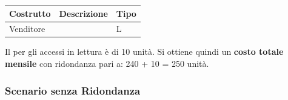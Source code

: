 \begin{itemize}
{\begin{longtable}{|
                >{\centering\arraybackslash}m{2cm}|
                >{\centering\arraybackslash}m{1.5cm}|
                >{\centering\arraybackslash}m{1cm}|
                }
                \hline
                \textbf{Costrutto} & \textbf{Descrizione} & \textbf{Tipo} \\
                \hline
                \endhead
                
                Venditore & 10 & L \\
                \hline
                
        \end{longtable}

        Il per gli accessi in lettura è di 10 unità.
        \newline Si ottiene quindi un \textbf{costo totale mensile} con ridondanza pari a: 240 + 10 = 250 unità.
    }
\end{itemize}

\vspace{0.5cm}
\subsubsection{Scenario senza Ridondanza}

